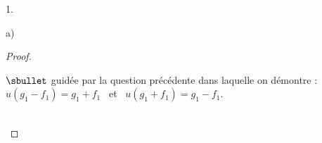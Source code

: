\begin{noliste}{1.}
\begin{noliste}{a)}
\begin{proof}
\begin{remark}
\begin{noliste}{$\sbullet$}
      guidée par la question précédente dans laquelle on démontre :
      $u(g_1 - f_1) = g_1 + f_1$ \ et \ $u(g_1 + f_1) = g_1 - f_1$.
    \end{noliste}
    \end{remark}~\\[-1.4cm]
\end{proof}
\end{noliste}

\end{noliste}
